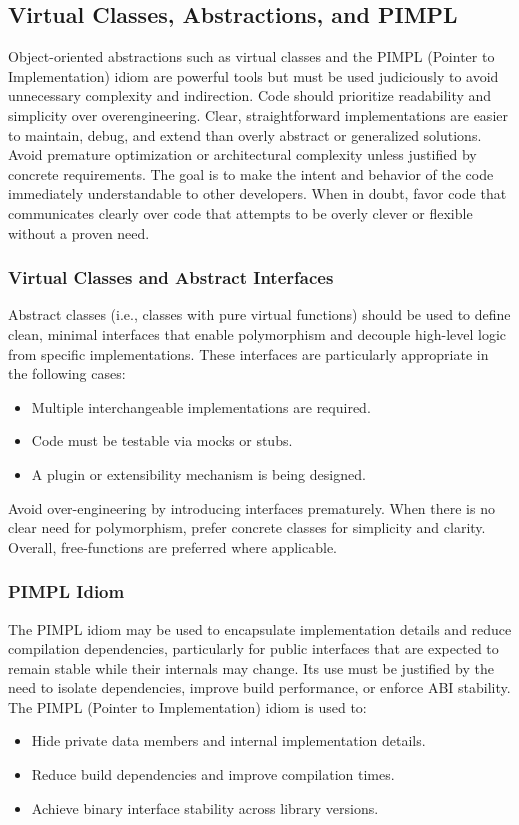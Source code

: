 \subsection{Virtual Classes, Abstractions, and PIMPL}

Object-oriented abstractions such as virtual classes and the PIMPL (Pointer to Implementation) idiom are powerful tools but must be used judiciously to avoid unnecessary complexity and indirection. Code should prioritize readability and simplicity over overengineering. Clear, straightforward implementations are easier to maintain, debug, and extend than overly abstract or generalized solutions. Avoid premature optimization or architectural complexity unless justified by concrete requirements. The goal is to make the intent and behavior of the code immediately understandable to other developers. When in doubt, favor code that communicates clearly over code that attempts to be overly clever or flexible without a proven need.

\subsubsection*{Virtual Classes and Abstract Interfaces}

Abstract classes (i.e., classes with pure virtual functions) should be used to define clean, minimal interfaces that enable polymorphism and decouple high-level logic from specific implementations. These interfaces are particularly appropriate in the following cases:
\begin{itemize}\itemsep0em
    \item Multiple interchangeable implementations are required.
    \item Code must be testable via mocks or stubs.
    \item A plugin or extensibility mechanism is being designed.
\end{itemize}
Avoid over-engineering by introducing interfaces prematurely. When there is no clear need for polymorphism, prefer concrete classes for simplicity and clarity. Overall, free-functions are preferred where applicable.

\subsubsection*{PIMPL Idiom}

The PIMPL idiom may be used to encapsulate implementation details and reduce compilation dependencies, particularly for public interfaces that are expected to remain stable while their internals may change. Its use must be justified by the need to isolate dependencies, improve build performance, or enforce ABI stability. The PIMPL (Pointer to Implementation) idiom is used to:
\begin{itemize}\itemsep0em
    \item Hide private data members and internal implementation details.
    \item Reduce build dependencies and improve compilation times.
    \item Achieve binary interface stability across library versions.
\end{itemize}

